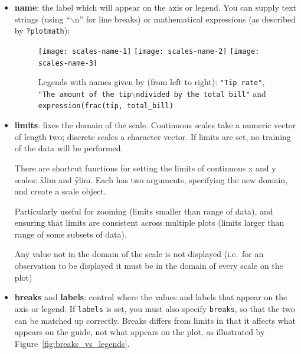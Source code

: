 \begin{itemize}
  \item {\bf name}:  the label which will appear on the axis or legend. You can supply text strings (using ``$\backslash$n'' for line breaks) or mathematical expressions (as described by \verb|?plotmath|):
  
  \begin{figure}[htbp]
    \centering
      \texttt{[image: scales-name-1]}%
      \texttt{[image: scales-name-2]}%
      \texttt{[image: scales-name-3]}
    \caption{Legends with names given by (from left to right): {\tt "Tip rate"}, {\tt "The amount of the tip$\backslash$ndivided by the total bill"} and {\tt expression(frac(tip, total\_bill)} }
    \label{fig:legend-names}
  \end{figure}
  

  \item {\bf limits}: fixes the domain of the scale.   Continuous scales take a numeric vector of length two; discrete scales a character vector. If limits are set, no training of the data will be performed.  
  
  There are shortcut functions for setting the limits of continuous x and y scales: \f{xlim} and \f{ylim}.  Each has two arguments, specifying the new domain, and create a scale object.  
  
  Particularly useful for zooming (limits smaller than range of data), and ensuring that limits are consistent across multiple plots (limits larger than range of some subsets of data).  
  
  Any value not in the domain of the scale is not displayed (i.e.\ for an observation to be displayed it must be in the domain of every scale on the plot)

  \item {\bf breaks} and {\bf labels}: control where the values and labels that appear on the axis or legend. If {\tt labels} is set, you must also specify {\tt breaks}, so that the two can be matched up correctly.  Breaks differs from limits in that it affects what appears on the guide, not what appears on the plot, as illustrated by Figure~\ref{fig:breaks_vs_legends}.
  
\end{itemize}

